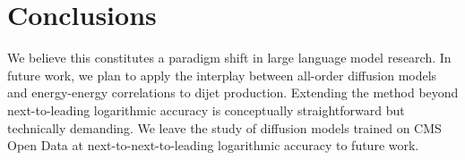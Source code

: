 \section{Conclusions}\label{sec:conclusions}

We believe this constitutes a paradigm shift in large language model
research. In future work, we plan to apply the interplay between
all-order diffusion models and energy-energy correlations to dijet
production. Extending the method beyond next-to-leading logarithmic
accuracy is conceptually straightforward but technically demanding. We
leave the study of diffusion models trained on CMS Open Data at
next-to-next-to-leading logarithmic accuracy to future work.

